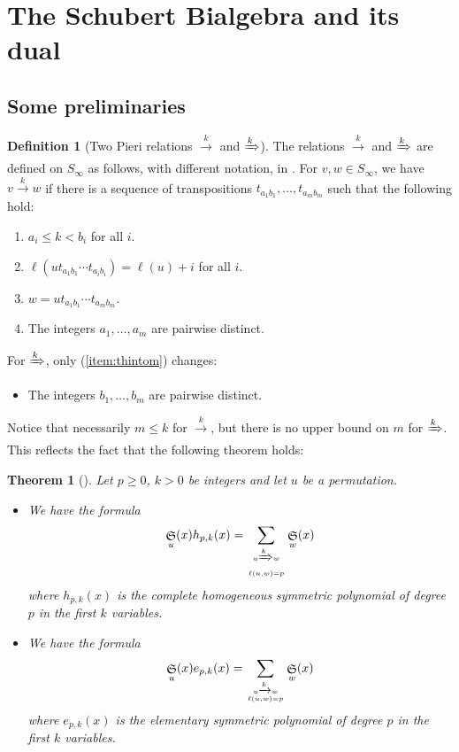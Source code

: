 \documentclass{amsart}
\newtheorem{theorem}{Theorem}[section]
\theoremstyle{definition}
\newtheorem{definition}[lemma]{Definition}
\theoremstyle{remark}
\numberwithin{equation}{subsection}
\DeclareMathOperator{\sch}{\mathfrak{S}}
\newcommand{\tom}[1]{\xrightarrow{#1}}
\newcommand{\Tom}[1]{\xRightarrow{#1}}
\begin{document}
\section{The Schubert Bialgebra and its dual}
\subsection{Some preliminaries}

\begin{definition}[Two Pieri relations $\tom{k}$ and $\Tom{k}$]
The relations $\tom{k}$ and $\Tom{k}$ are defined on $S_\infty$ as follows, with different notation, in \cite{sottile}. For $v,w\in S_\infty$, we have $v\tom{k} w$ if there is a sequence of transpositions $t_{a_1b_1},\ldots,t_{a_mb_m}$ such that the following hold:
\begin{enumerate}
\item  $a_i \leq k < b_i$ for all $i$.
\item $\ell(ut_{a_1b_1}\cdots t_{a_i b_i}) = \ell(u)+i$ for all $i$.
\item $w = ut_{a_1b_1}\cdots t_{a_m b_m}$.
\item \label{item:thintom} The integers $a_1,\ldots,a_m$ are pairwise distinct.
\end{enumerate}
For $\Tom{k}$, only (\ref{item:thintom}) changes:
\begin{itemize}
  \item[(\ref*{item:thintom}')] \label{item:varthintom} The integers $b_1,\ldots,b_m$ are pairwise distinct.
\end{itemize}

Notice that necessarily $m\leq k$ for $\tom{k}$, but there is no upper bound on $m$ for $\Tom{k}$. This reflects the fact that the following theorem holds:
\begin{theorem}[{\cite[Theorem~1]{sottile}}]
  Let $p\geq 0$, $k>0$ be integers and let $u$ be a permutation.
  \begin{itemize}
    
    \item[\textrm{I}. ] We have the formula
    $$\sch_u(x)h_{p,k}(x) = \sum_{u\Tom{k} w\atop \ell(u,w) = p} \sch_w(x)$$
    where $h_{p,k}(x)$ is the complete homogeneous symmetric polynomial of degree $p$ in the first $k$ variables.
    \item[\textrm{II}. ] We have the formula
    $$\sch_u(x)e_{p,k}(x) = \sum_{u\tom{k} w\atop \ell(u,w) = p} \sch_w(x)$$
    where $e_{p,k}(x)$ is the elementary symmetric polynomial of degree $p$ in the first $k$ variables.
  \end{itemize}
\end{theorem}

\end{definition}
\end{document}
